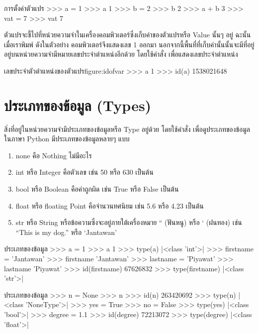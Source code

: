 \begin{codelist}{การตั้งค่าตัวแปร}{}
>>> a = 1
>>> a
1
>>> b = 2
>>> b
2
>>> a + b
3
>>> vat = 7
>>> vat
7
\end{codelist}

ตัวแปรจะชี้ไปที่หน่วยความจำในเครื่องคอมพิวเตอร์ซึ่งเก็บค่าของตัวแปรหรือ Value นั้นๆ อยู่ ฉะนั้นเมื่อเราพิมพ์  ดังในตัวอย่าง คอมพิวเตอร์จึงแสดงเลข 1 ออกมา นอกจากนี้พื้นที่ที่เก็บค่านั้นนั้นจะมีที่อยู่อยู่บนหน่วยความจำมีหมายเลขประจำตำแหน่งอีกด้วย โดยใช้คำสั่ง  เพื่อแสดงเลขประจำตำแหน่ง

\begin{codelist}{เลขประจำตัวตำแหน่งของตัวแปร}{figure:idofvar}
>>> a
1
>>> id(a)
1538021648
\end{codelist}

\section{ประเภทของข้อมูล (Types)}

สิ่งที่อยู่ในหน่วยความจำมีประเภทของข้อมูลหรือ Type อยู่ด้วย โดยใช้คำสั่ง  เพื่อดูประเภทของข้อมูล ในภาษา Python มีประเภทของข้อมูลหลายๆ แบบ \cite{Luc15}

\begin{enumerate}[noitemsep]
\item none คือ Nothing ไม่มีอะไร 
\item int หรือ Integer คือตัวเลข เช่น 50 หรือ 630 เป็นต้น
\item bool หรือ Boolean คือค่าถูกผิด เช่น True หรือ False เป็นต้น
\item float หรือ floating Point คือจำนวนทศนิยม เช่น 5.6 หรือ 4.23 เป็นต้น
\item str หรือ String หรือข้อความซึ่งจะอยู่ภายใต้เครื่องหมาย `` (ฟันหนู) หรือ ` (ฝนทอง) เช่น ``This is my dog.''  หรือ `Jantawan'
\end{enumerate}

\begin{codelist}{ประเภทของข้อมูล}{}
>>> a = 1
>>> a
1
>>> type(a)
|<class \rq{}int\rq{}>|
>>> firstname = 'Jantawan'
>>> firstname
'Jantawan'
>>> lastname = 'Piyawat'
>>> lastname
'Piyawat'
>>> id(firstname)
67626832
>>> type(firstname)
|<class \rq{}str\rq{}>|
\end{codelist}


\begin{codelist}{ประเภทของข้อมูล}{}
>>> n = None
>>> n
>>> id(n)
263420692
>>> type(n)
|<class \rq{}NoneType\rq{}>|
>>> yes = True
>>> no = False
>>> type(yes)
|<class \rq{}bool\rq{}>|
>>> degree = 1.1
>>> id(degree)
72213072
>>> type(degree)
|<class \rq{}float\rq{}>|
\end{codelist}


